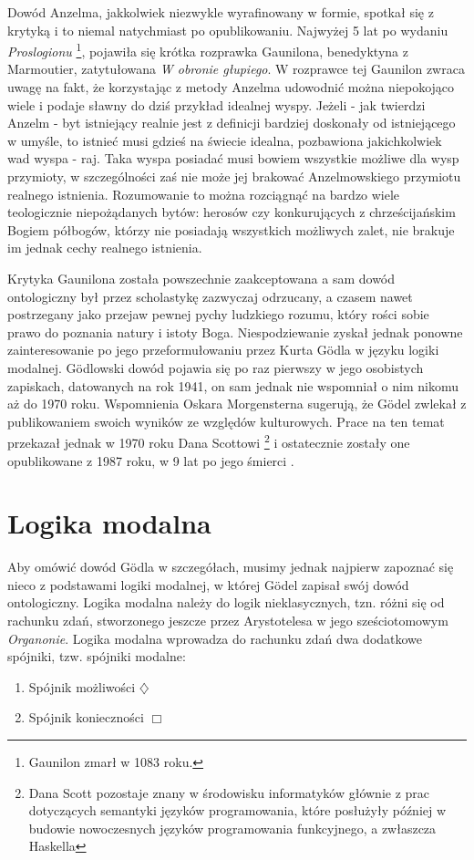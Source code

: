 \documentclass{article}
\begin{document}
Dowód Anzelma, jakkolwiek niezwykle wyrafinowany w formie, spotkał się z krytyką i to niemal natychmiast po opublikowaniu. Najwyżej 5 lat po wydaniu \emph{Proslogionu} \footnote{Gaunilon zmarł w 1083 roku.}, pojawiła się krótka rozprawka Gaunilona, benedyktyna z Marmoutier, zatytułowana \emph{W obronie głupiego}. W rozprawce tej Gaunilon zwraca uwagę na fakt, że korzystając z metody Anzelma udowodnić można niepokojąco wiele i podaje sławny do dziś przykład idealnej wyspy. Jeżeli - jak twierdzi Anzelm - byt istniejący realnie jest z definicji bardziej doskonały od istniejącego w umyśle, to istnieć musi gdzieś na świecie idealna, pozbawiona jakichkolwiek wad wyspa - raj. Taka wyspa posiadać musi bowiem wszystkie możliwe dla wysp przymioty, w szczególności zaś nie może jej brakować Anzelmowskiego przymiotu realnego istnienia. Rozumowanie to można rozciągnąć na bardzo wiele teologicznie niepożądanych bytów: herosów czy konkurujących z chrześcijańskim Bogiem półbogów, którzy nie posiadają wszystkich możliwych zalet, nie brakuje im jednak cechy realnego istnienia. 

Krytyka Gaunilona została powszechnie zaakceptowana a sam dowód ontologiczny był przez scholastykę zazwyczaj odrzucany, a czasem nawet postrzegany jako przejaw pewnej pychy ludzkiego rozumu, który rości sobie prawo do poznania natury i istoty Boga. Niespodziewanie zyskał jednak ponowne zainteresowanie po jego przeformułowaniu przez Kurta Gödla w języku logiki modalnej. Gödlowski dowód pojawia się po raz pierwszy w jego osobistych zapiskach, datowanych na rok 1941, on sam jednak nie wspomniał o nim nikomu aż do 1970 roku. Wspomnienia Oskara Morgensterna sugerują, że Gödel zwlekał z publikowaniem swoich wyników ze względów kulturowych. Prace na ten temat przekazał jednak w 1970 roku Dana Scottowi \footnote{Dana Scott pozostaje znany w środowisku informatyków głównie z prac dotyczących semantyki języków programowania, które posłużyły później w budowie nowoczesnych języków programowania funkcyjnego, a zwłaszcza Haskella} i ostatecznie zostały one opublikowane z 1987 roku, w 9 lat po jego śmierci \cite{godel1995}. 

\section{Logika modalna} \label{sec:modal-logic}

Aby omówić dowód Gödla w szczegółach, musimy jednak najpierw zapoznać się nieco z podstawami logiki modalnej, w której Gödel zapisał swój dowód ontologiczny. Logika modalna należy do logik nieklasycznych, tzn. różni się od rachunku zdań, stworzonego jeszcze przez Arystotelesa w jego sześciotomowym \emph{Organonie}. Logika modalna wprowadza do rachunku zdań dwa dodatkowe spójniki, tzw. spójniki modalne:
\begin{enumerate}
	\item Spójnik możliwości $\diamondsuit$
	\item Spójnik konieczności $\Box$
\end{enumerate}
\end{document}
